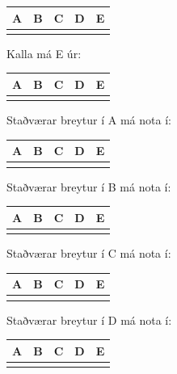 \documentclass{article}
\newcommand{\bo}[1]{\textbf{#1}}
\begin{document}
\begin{tabularx}{\textwidth}{|X|X|X|X|X|}
    \hline
    \bo{A} & \bo{B} & \bo{C} & \bo{D} & \bo{E}\\ \hline
    & & & & \\ \hline
\end{tabularx}


\vspace{1cm}

Kalla má E úr:


\begin{tabularx}{\textwidth}{|X|X|X|X|X|}
    \hline
    \bo{A} & \bo{B} & \bo{C} & \bo{D} & \bo{E}\\ \hline
    & & & & \\ \hline
\end{tabularx}

\vspace{1cm}

Staðværar breytur í A má nota í:


\begin{tabularx}{\textwidth}{|X|X|X|X|X|}
    \hline
    \bo{A} & \bo{B} & \bo{C} & \bo{D} & \bo{E}\\ \hline
    & & & & \\ \hline
\end{tabularx}

\vspace{1cm}

Staðværar breytur í B má nota í:


\begin{tabularx}{\textwidth}{|X|X|X|X|X|}
    \hline
    \bo{A} & \bo{B} & \bo{C} & \bo{D} & \bo{E}\\ \hline
    & & & & \\ \hline
\end{tabularx}

\vspace{1cm}

Staðværar breytur í C má nota í:


\begin{tabularx}{\textwidth}{|X|X|X|X|X|}
    \hline
    \bo{A} & \bo{B} & \bo{C} & \bo{D} & \bo{E}\\ \hline
    & & & & \\ \hline
\end{tabularx}

\vspace{1cm}

Staðværar breytur í D má nota í:


\begin{tabularx}{\textwidth}{|X|X|X|X|X|}
    \hline
    \bo{A} & \bo{B} & \bo{C} & \bo{D} & \bo{E}\\ \hline
    & & & & \\ \hline
\end{tabularx}
\end{document}
